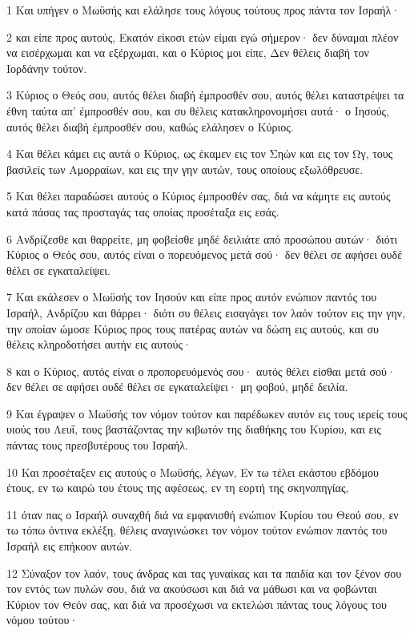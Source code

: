 \par 1 Και υπήγεν ο Μωϋσής και ελάλησε τους λόγους τούτους προς πάντα τον Ισραήλ·
\par 2 και είπε προς αυτούς, Εκατόν είκοσι ετών είμαι εγώ σήμερον· δεν δύναμαι πλέον να εισέρχωμαι και να εξέρχωμαι, και ο Κύριος μοι είπε, Δεν θέλεις διαβή τον Ιορδάνην τούτον.
\par 3 Κύριος ο Θεός σου, αυτός θέλει διαβή έμπροσθέν σου, αυτός θέλει καταστρέψει τα έθνη ταύτα απ' έμπροσθέν σου, και συ θέλεις κατακληρονομήσει αυτά· ο Ιησούς, αυτός θέλει διαβή έμπροσθέν σου, καθώς ελάλησεν ο Κύριος.
\par 4 Και θέλει κάμει εις αυτά ο Κύριος, ως έκαμεν εις τον Σηών και εις τον Ωγ, τους βασιλείς των Αμορραίων, και εις την γην αυτών, τους οποίους εξωλόθρευσε.
\par 5 Και θέλει παραδώσει αυτούς ο Κύριος έμπροσθέν σας, διά να κάμητε εις αυτούς κατά πάσας τας προσταγάς τας οποίας προσέταξα εις εσάς.
\par 6 Ανδρίζεσθε και θαρρείτε, μη φοβείσθε μηδέ δειλιάτε από προσώπου αυτών· διότι Κύριος ο Θεός σου, αυτός είναι ο πορευόμενος μετά σού· δεν θέλει σε αφήσει ουδέ θέλει σε εγκαταλείψει.
\par 7 Και εκάλεσεν ο Μωϋσής τον Ιησούν και είπε προς αυτόν ενώπιον παντός του Ισραήλ, Ανδρίζου και θάρρει· διότι συ θέλεις εισαγάγει τον λαόν τούτον εις την γην, την οποίαν ώμοσε Κύριος προς τους πατέρας αυτών να δώση εις αυτούς, και συ θέλεις κληροδοτήσει αυτήν εις αυτούς·
\par 8 και ο Κύριος, αυτός είναι ο προπορευόμενός σου· αυτός θέλει είσθαι μετά σού· δεν θέλει σε αφήσει ουδέ θέλει σε εγκαταλείψει· μη φοβού, μηδέ δειλία.
\par 9 Και έγραψεν ο Μωϋσής τον νόμον τούτον και παρέδωκεν αυτόν εις τους ιερείς τους υιούς του Λευΐ, τους βαστάζοντας την κιβωτόν της διαθήκης του Κυρίου, και εις πάντας τους πρεσβυτέρους του Ισραήλ.
\par 10 Και προσέταξεν εις αυτούς ο Μωϋσής, λέγων, Εν τω τέλει εκάστου εβδόμου έτους, εν τω καιρώ του έτους της αφέσεως, εν τη εορτή της σκηνοπηγίας,
\par 11 όταν πας ο Ισραήλ συναχθή διά να εμφανισθή ενώπιον Κυρίου του Θεού σου, εν τω τόπω όντινα εκλέξη, θέλεις αναγινώσκει τον νόμον τούτον ενώπιον παντός του Ισραήλ εις επήκοον αυτών.
\par 12 Σύναξον τον λαόν, τους άνδρας και τας γυναίκας και τα παιδία και τον ξένον σου τον εντός των πυλών σου, διά να ακούσωσι και διά να μάθωσι και να φοβώνται Κύριον τον Θεόν σας, και διά να προσέχωσι να εκτελώσι πάντας τους λόγους του νόμου τούτου·
